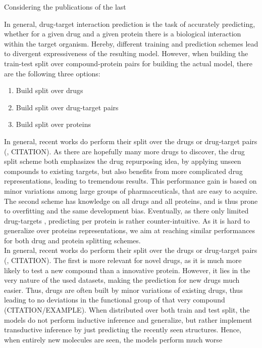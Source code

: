\documentclass{bioinfo}
\renewcommand{\cite}{\citep}
\begin{document}
Considering the publications of the last 


In general, drug-target interaction prediction is the task of accurately predicting, whether for a given drug and a given protein there is a biological interaction within the target organism. Hereby, different training and prediction schemes lead to divergent expressiveness of the resulting model. However, when building the train-test split over compound-protein pairs for building the actual model, there are the following three options:

\begin{enumerate}
	\item Build split over drugs
	\item Build split over drug-target pairs
	\item Build split over proteins
\end{enumerate} 
In general, recent works do perform their split over the drugs or drug-target pairs (\cite{Survey2018}, CITATION). As there are hopefully many more drugs to discover, the drug split scheme both emphasizes the drug repurposing idea, by applying unseen compounds to existing targets, but also benefits from more complicated drug representations, leading to tremendous results. This performance gain is based on minor variations among large groups of pharmaceuticals, that are easy to acquire. The second scheme has knowledge on all drugs and all proteins, and is thus prone to overfitting and the same development bias. Eventually, as there only limited drug-targets \citep{Overington2006}, predicting per protein is rather counter-intuitive. As it is hard to generalize over proteins representations, we aim at reaching similar performances for both drug and protein splitting schemes. \\

In general, recent works do perform their split over the drugs or drug-target pairs (\cite{Survey2018}, CITATION). The first is more relevant for novel drugs, as it is much more likely to test a new compound than a innovative protein. However, it lies in the very nature of the used datasets, making the prediction for new drugs much easier. Thus, drugs are often built by minor variations of existing drugs, thus leading to no deviations in the functional group of that very compound (CITATION/EXAMPLE). When distributed over both train and test split, the models do not perform inductive inference and generalize, but rather implement transductive inference by just predicting the recently seen structures. Hence, when entirely new molecules are seen, the models perform much worse
\end{document}
